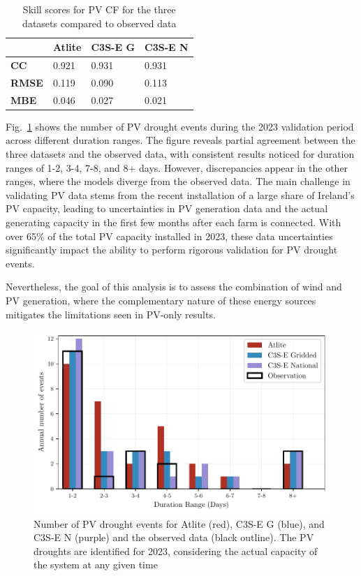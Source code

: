 \documentclass[preprint, 12pt]{elsarticle}
\begin{document}
\begin{table}[!ht]
	\centering
	\begin{tabular}{l|lll|}
		\cline{2-4}
		& \textbf{Atlite} & \textbf{C3S-E G} & \textbf{C3S-E N} \\ \hline
		\multicolumn{1}{|l|}{\textbf{CC}}   & 0.921           & 0.931            & 0.931            \\ \hline
		\multicolumn{1}{|l|}{\textbf{RMSE}} & 0.119           & 0.090            & 0.113            \\ \hline
		\multicolumn{1}{|l|}{\textbf{MBE}}   & 0.046           & 0.027           & 0.021           \\ \hline
	\end{tabular}
	\caption{Skill scores for PV CF for the three datasets compared to observed data}
	\label{tab:pv_skill_scores}
\end{table}

Fig.~\ref{fig:bar_number_events_verification_pv} shows the number of PV drought events during the 2023 validation period across different duration ranges. The figure reveals partial agreement between the three datasets and the observed data, with consistent results noticed for duration ranges of 1-2, 3-4, 7-8, and 8+ days. However, discrepancies appear in the other ranges, where the models diverge from the observed data. The main challenge in validating PV data stems from the recent installation of a large share of Ireland’s PV capacity, leading to uncertainties in PV generation data and the actual generating capacity in the first few months after each farm is connected. With over 65\% of the total PV capacity installed in 2023, these data uncertainties significantly impact the ability to perform rigorous validation for PV drought events. 

Nevertheless, the goal of this analysis is to assess the combination of wind and PV generation, where the complementary nature of these energy sources mitigates the limitations seen in PV-only results.

\begin{figure}[!ht]
	\centering
	\includegraphics[width=\textwidth]{verification_pv_number_events.pdf}
	\caption{Number of PV drought events for Atlite (red), C3S-E G (blue), and C3S-E N (purple) and the observed data (black outline). The PV droughts are identified for 2023, considering the actual capacity of the system at any given time}
	\label{fig:bar_number_events_verification_pv}
\end{figure}
\end{document}
